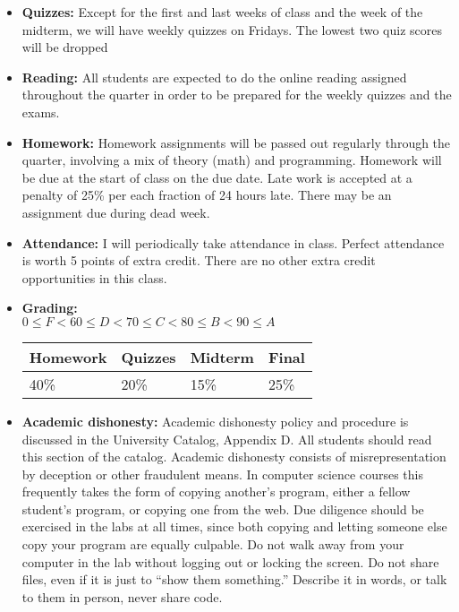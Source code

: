 \documentclass{article}
\begin{document}
\begin{itemize}
\item {\bf Quizzes:} Except for the first and last weeks of class and
  the week of the midterm, we will have weekly quizzes on Fridays.  The
  lowest two quiz scores will be dropped

\item {\bf Reading:} All students are expected to do the online
  reading assigned throughout the quarter in order to be prepared for
  the weekly quizzes and the exams.

\item {\bf Homework:}  Homework assignments will be passed out
  regularly through the quarter, involving a mix of theory (math) and
  programming.   Homework will be due at the start of
  class on the due date.  Late work is accepted at a penalty
  of 25\% per each fraction of 24 hours late.  There may be an assignment
  due during dead week.

\item {\bf Attendance:}  I will periodically take attendance in
  class.  Perfect attendance is worth 5 points of extra credit.  There
  are no other extra credit opportunities in this class.

\item {\bf Grading:} \\
$0\leq F < 60 \leq D < 70 \leq C < 80 \leq B < 90 \leq A$\hfill
\begin{tabular}{|l|l|l|l|}\hline
Homework & Quizzes & Midterm & Final\\\hline
40\% & 20\% & 15\% & 25\%\\\hline
\end{tabular}

\item {\bf Academic dishonesty:} Academic dishonesty policy and
  procedure is discussed in the University Catalog, Appendix D.  All
  students should read this section of the catalog.  Academic
  dishonesty consists of misrepresentation by deception or other
  fraudulent means.  In computer science courses this frequently takes
  the form of copying another's program, either a fellow student's
  program, or copying one from the web.  Due diligence should be
  exercised in the labs at all times, since both copying and letting
  someone else copy your program are equally culpable.  Do not walk
  away from your computer in the lab without logging out or locking
  the screen.  Do not share files, even if it is just to ``show them
  something.''  Describe it in words, or talk to them in person, never
  share code.


\end{itemize}
\end{document}
